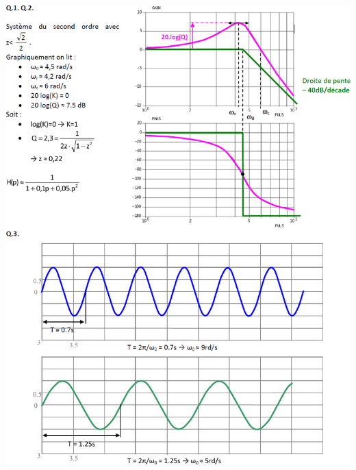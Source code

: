 \documentclass[10pt,fleqn]{article} %
\begin{document}
\ifprof
\begin{center}
\includegraphics[width=\textwidth]{images/cor_01}


\end{center}
\end{document}
